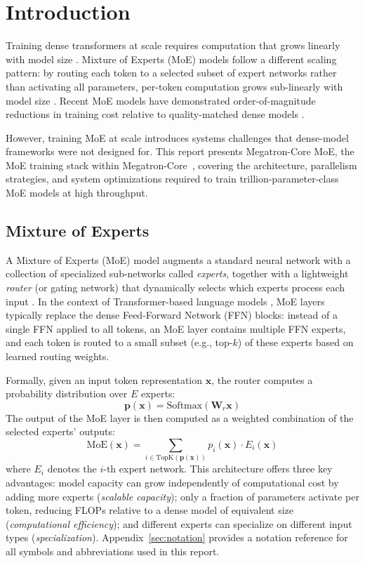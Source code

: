\documentclass[10pt,logo,copyright]{nvidiatechreport}
\begin{document}
\section{Introduction}

Training dense transformers at scale requires computation that grows linearly with model size \cite{kaplan2020scaling,hoffmann2022chinchilla}. Mixture of Experts (MoE) models follow a different scaling pattern: by routing each token to a selected subset of expert networks rather than activating all parameters, per-token computation grows sub-linearly with model size \cite{shazeer2017,fedus2022switchtransformersscalingtrillion}. Recent MoE models have demonstrated order-of-magnitude reductions in training cost relative to quality-matched dense models \cite{jiang2024mixtralexperts,deepseekai2025deepseekv3technicalreport,Cai_2025}.

However, training MoE at scale introduces systems challenges that dense-model frameworks were not designed for. This report presents Megatron-Core MoE, the MoE training stack within Megatron-Core~\cite{shoeybi2020megatronlmtrainingmultibillionparameter}, covering the architecture, parallelism strategies, and system optimizations required to train trillion-parameter-class MoE models at high throughput.

\subsection{Mixture of Experts}

A Mixture of Experts (MoE) model augments a standard neural network with a collection of specialized sub-networks called \emph{experts}, together with a lightweight \emph{router} (or gating network) that dynamically selects which experts process each input \cite{shazeer2017,jacobs1991adaptive,eigen2013learning}. In the context of Transformer-based language models \cite{vaswani2017attention}, MoE layers typically replace the dense Feed-Forward Network (FFN) blocks: instead of a single FFN applied to all tokens, an MoE layer contains multiple FFN experts, and each token is routed to a small subset (e.g., top-$k$) of these experts based on learned routing weights.

Formally, given an input token representation $\mathbf{x}$, the router computes a probability distribution over $E$ experts:
\[
\mathbf{p}(\mathbf{x}) = \text{Softmax}(\mathbf{W}_r \mathbf{x})
\]
The output of the MoE layer is then computed as a weighted combination of the selected experts' outputs:
\[
\text{MoE}(\mathbf{x}) = \sum_{i \in \text{TopK}(\mathbf{p}(\mathbf{x}))} p_i(\mathbf{x}) \cdot E_i(\mathbf{x})
\]
where $E_i$ denotes the $i$-th expert network. This architecture offers three key advantages: model capacity can grow independently of computational cost by adding more experts (\emph{scalable capacity}); only a fraction of parameters activate per token, reducing FLOPs relative to a dense model of equivalent size (\emph{computational efficiency}); and different experts can specialize on different input types (\emph{specialization}). Appendix~\ref{sec:notation} provides a notation reference for all symbols and abbreviations used in this report.
\end{document}
